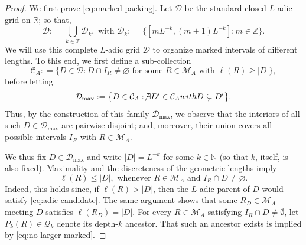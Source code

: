 \documentclass[10pt,a4paper]{amsart}
\begin{document}
\begin{proof}
We first prove \eqref{eq:marked-packing}.  Let $\mathcal D$ be the standard closed $L$-adic grid on $\mathbb R$; so that,
$$
\mathcal{D} : = \bigcup_{k \in \mathbb{Z}} \mathcal{D}_k, \textrm{ with } \mathcal{D}_k : = \big\{[m L^{-k}, (m+1) L^{-k}] : m \in \mathbb{Z} \big\}.
$$
We will use this complete $L$-adic grid $\mathcal{D}$ to organize marked intervals of different lengths.  To this end, we first define a sub-collection
\begin{equation}\label{eq:adic-candidate}
\mathcal{C}_A : = \big\{D\in\mathcal D:D\cap I_R\neq\varnothing
 \text{ for some }R\in\mathscr M_A\text{ with }\ell(R)\geq|D| \big\},
\end{equation}
before letting
\begin{equation}\label{eq:maximal-adic}
\mathcal D_{\max} : = \big\{D \in \mathcal{C}_A : \not\exists D' \in \mathcal{C}_A \textrm{ with }  D \subsetneq D' \big\}.
\end{equation}
Thus, by the construction of this family $\mathcal{D}_{\max}$, we observe that the interiors of all such $D \in \mathcal{D}_{\max}$ are pairwise disjoint; and, moreover, their union covers all possible intervals $I_R$ with $R \in \mathscr{M}_A$.

We thus fix $D\in\mathcal D_{\max}$ and write $|D|=L^{-k}$ for some $k \in \mathbb{N}$ (so that $k$, itself, is also fixed).  Maximality and the discreteness of the geometric lengths imply
\begin{equation}\label{eq:no-larger-marked}
 \ell(R)\leq|D|,
 \text{ whenever }R\in\mathscr M_A\text{ and }I_R\cap D\neq\varnothing.
\end{equation}
Indeed, this holds since, if $\ell(R)>|D|$, then the $L$-adic parent of $D$ would satisfy \eqref{eq:adic-candidate}. The same argument shows that some $R_D\in\mathscr M_A$ meeting $D$ satisfies $\ell(R_D)=|D|$. For every $R\in\mathscr M_A$ satisfying $I_R \cap D \neq \emptyset$, let $P_k(R)\in\mathscr Q_k$ denote its depth-$k$ ancestor. That such an ancestor exists is implied by \eqref{eq:no-larger-marked}. 


\end{proof}
\end{document}
